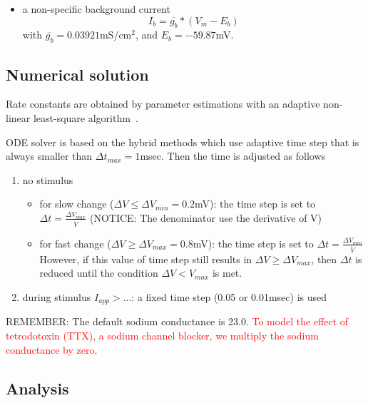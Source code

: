 \begin{enumerate}
\begin{itemize}
\item a non-specific background current 
  \begin{equation}
    \label{eq:722}
    I_b= \overline{g_b} * (V_m - E_b)
  \end{equation}
  with $\overline{g_b}=0.03921$mS/cm$^2$, and $E_b=-59.87$mV.
\end{itemize}

\end{enumerate}




\subsection{Numerical solution}
\label{sec:numerical-solution-4}

Rate constants are obtained by parameter estimations with an adaptive
non-linear least-square algorithm~\citep{dennis1981anl}.

ODE solver is based on the hybrid methods which use adaptive time step
that is always smaller than $\Delta t_{max} = 1$msec. Then the time is
adjusted as follows~\citep{rush1978pas}
\begin{enumerate}
\item no stimulus
  \begin{itemize}
  \item for slow change ($\Delta V \le \Delta V_{min}=0.2$mV): the
    time step is set to $\Delta t = \frac{\Delta V_{max}}{\dot{V}}$
    (NOTICE: The denominator use the derivative of V)
  \item for fast change ($\Delta V \ge \Delta V_{max}=0.8$mV): the
    time step is set to $\Delta t = \frac{\Delta V_{min}}{\dot{V}}$
    However, if this value of time step still results in $\Delta V \ge
    \Delta V_{max}$, then $\Delta t$ is reduced until the condition
    $\Delta V < V_{max}$ is met.
  \end{itemize}
\item during stimulus $I_{app} > ...$: a fixed time step (0.05 or
  0.01msec) is used
\end{enumerate}

REMEMBER: The default sodium conductance is 23.0.
\textcolor{red}{To model the effect of tetrodotoxin (TTX), a sodium
  channel blocker, we multiply the sodium conductance by zero}.

\subsection{Analysis}
\label{sec:analysis-10}

